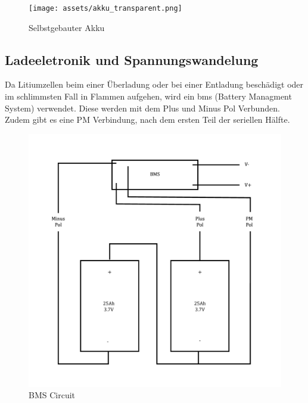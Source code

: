 \begin{figure}[H]
    \centering
    \texttt{[image: assets/akku\_transparent.png]}
    \caption{Selbstgebauter Akku}
    \label{fig:enter-label}
\end{figure}


\subsection{Ladeeletronik und Spannungswandelung}

Da Litiumzellen beim einer Überladung oder bei einer Entladung beschädigt oder im schlimmsten Fall in Flammen aufgehen, wird ein \ac{bms} (Battery Managment System) verwendet. Diese werden mit dem Plus und Minus Pol Verbunden. Zudem gibt es eine PM Verbindung, nach dem ersten Teil der seriellen Hälfte.


\begin{figure}
    \centering
    \includegraphics[width=0.75\linewidth]{assets/bms_circuit_image.png}
    \caption{BMS Circuit}
    \label{fig:enter-label}
\end{figure}
